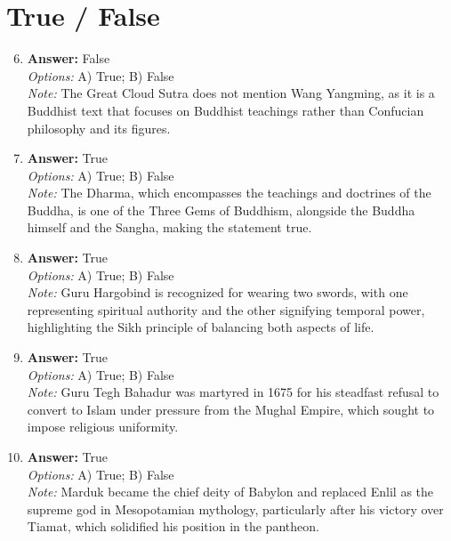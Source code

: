 \documentclass[12pt]{article}
\begin{document}
\section*{True / False}
\begin{enumerate}[label=\arabic*.]
\setcounter{enumi}{5}
\item \textbf{Answer:} False
\\ \textit{Options:} A) True; B) False
\\ \textit{Note:} The Great Cloud Sutra does not mention Wang Yangming, as it is a Buddhist text that focuses on Buddhist teachings rather than Confucian philosophy and its figures.
\item \textbf{Answer:} True
\\ \textit{Options:} A) True; B) False
\\ \textit{Note:} The Dharma, which encompasses the teachings and doctrines of the Buddha, is one of the Three Gems of Buddhism, alongside the Buddha himself and the Sangha, making the statement true.
\item \textbf{Answer:} True
\\ \textit{Options:} A) True; B) False
\\ \textit{Note:} Guru Hargobind is recognized for wearing two swords, with one representing spiritual authority and the other signifying temporal power, highlighting the Sikh principle of balancing both aspects of life.
\item \textbf{Answer:} True
\\ \textit{Options:} A) True; B) False
\\ \textit{Note:} Guru Tegh Bahadur was martyred in 1675 for his steadfast refusal to convert to Islam under pressure from the Mughal Empire, which sought to impose religious uniformity.
\item \textbf{Answer:} True
\\ \textit{Options:} A) True; B) False
\\ \textit{Note:} Marduk became the chief deity of Babylon and replaced Enlil as the supreme god in Mesopotamian mythology, particularly after his victory over Tiamat, which solidified his position in the pantheon.
\end{enumerate}
\end{document}
